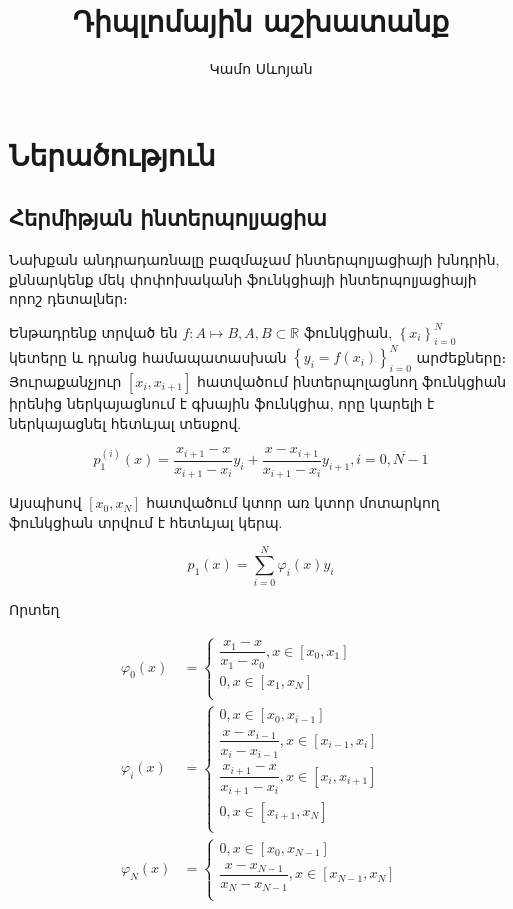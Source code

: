 \documentclass[fleqn, bachelor,subf,12pt,notitlepage]{disser}
\title{Դիպլոմային աշխատանք}
\author{Կամո Սևոյան}
\date{}
\begin{document}
\section*{Ներածություն}
\subsection*{Հերմիթյան ինտերպոլյացիա}


Նախքան անդրադառնալը բազմաչամ ինտերպոլյացիայի խնդրին, քննարկենք մեկ փոփոխականի ֆունկցիայի ինտերպոլյացիայի որոշ դետալներ։ 

Ենթադրենք տրված են $f:A \mapsto B, A, B \subset \mathbb{R}$ ֆունկցիան,  $\left\{x_{i}\right\}_{i=0}^{N}$ կետերը և դրանց համապատասխան $\left\{y_{i}=f\left(x_{i}\right)\right\}_{i=0}^{N}$ արժեքները։ Յուրաքանչյուր $\left[x_{i}, x_{i+1}\right]$ հատվածում ինտերպոլացնող ֆունկցիան իրենից ներկայացնում է գխային ֆունկցիա, որը կարելի է ներկայացնել հետևյալ տեսքով.

$$p_{1}^{(i)}\left(x\right)=\dfrac{x_{i+1}-x}{x_{i+1}-x_{i}}y_{i}+\dfrac{x-x_{i+1}}{x_{i+1}-x_{i}}y_{i+1}, i=\overline{0, N-1}$$

Այսպիսով $\left[x_{0}, x_{N}\right]$ հատվածում կտոր առ կտոր մոտարկող ֆունկցիան տրվում է հետևյալ կերպ.

$$p_{1}\left(x\right)=\sum_{i=0}^{N}\varphi_{i} \left(x\right)y_{i}$$

Որտեղ 

\begin{align*}
\varphi_{0}\left(x\right)&=\begin{cases}
\dfrac{x_{1}-x}{x_{1}-x_{0}}, x\in \left[x_{0}, x_{1}\right]\\
0, x\in \left[x_{1}, x_{N}\right]\\
\end{cases}\\
\varphi_{i}\left(x\right)&=\begin{cases}
0, x\in \left[x_{0}, x_{i-1}\right]\\
\dfrac{x-x_{i-1}}{x_{i}-x_{i-1}}, x\in \left[x_{i-1}, x_{i}\right]\\
\dfrac{x_{i+1}-x}{x_{i+1}-x_{i}}, x\in \left[x_{i}, x_{i+1}\right]\\
0, x\in \left[x_{i+1}, x_{N}\right]\\
\end{cases}\\
\varphi_{N}\left(x\right)&=\begin{cases}
0, x\in \left[x_{0}, x_{N-1}\right]\\
\dfrac{x-x_{N-1}}{x_{N}-x_{N-1}}, x\in \left[x_{N-1}, x_{N}\right]\\
\end{cases}
\end{align*}
\end{document}
